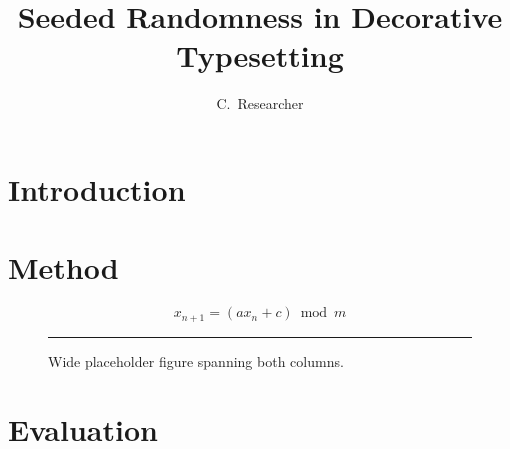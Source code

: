 \documentclass[10pt,twocolumn,letterpaper]{article}
\title{Seeded Randomness in Decorative Typesetting}
\author{C.~Researcher}
\begin{document}
\maketitle
\begin{abstract}\lipsum[1][1-5]\end{abstract}
\section{Introduction}\lipsum[2-4]
\section{Method}
\begin{equation} x_{n+1} = (a x_n + c) \bmod m \end{equation}
\lipsum[5-8]
\begin{figure}[t]\centering\rule{0.9\textwidth}{3cm}
\caption{Wide placeholder figure spanning both columns.}\end{figure}
\section{Evaluation}\lipsum[9-14]
\end{document}
